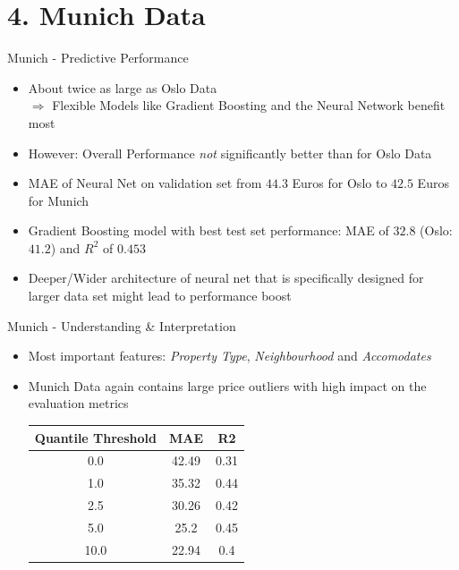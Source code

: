 \documentclass[ngerman,inputenc]{beamer}
\begin{document}
\section{4. Munich Data}

\begin{frame}{Munich - Predictive Performance}
  \begin{itemize}
    \item About twice as large as Oslo Data \\
          $\Rightarrow$ Flexible Models like Gradient Boosting and the Neural Network
          benefit most \pause
    \item However: Overall Performance \emph{not} significantly better than for Oslo Data
    \item MAE of Neural Net on validation set from $44.3$ Euros for Oslo to $42.5$ Euros for Munich
    \item Gradient Boosting model with best test set performance: MAE of $32.8$ (Oslo: $41.2$) and $R^2$ of $0.453$ \pause
    \item Deeper/Wider architecture of neural net that is specifically designed for larger data set might lead to performance boost
  \end{itemize}
\end{frame}

\begin{frame}{Munich - Understanding \& Interpretation}
  \begin{itemize}
    \item Most important features: \emph{Property Type}, \emph{Neighbourhood} and \emph{Accomodates} \pause
    \item Munich Data again contains large price outliers with high impact on the evaluation metrics
          \vspace{1em}
          \begin{table}[h]
            \centering
            \begin{tabular}{@{}ccc@{}}
              \toprule
              Quantile Threshold & MAE   & R2   \\ \midrule
              0.0                & 42.49 & 0.31 \\
              1.0                & 35.32 & 0.44 \\
              2.5                & 30.26 & 0.42 \\
              5.0                & 25.2  & 0.45 \\
              10.0               & 22.94 & 0.4  \\ \bottomrule
            \end{tabular}
            \label{tab:munich-outliers}
          \end{table}
  \end{itemize}
\end{frame}
\end{document}
